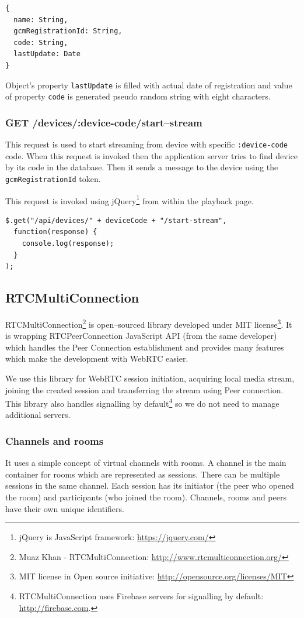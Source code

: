 \begin{lstlisting}
{
  name: String,
  gcmRegistrationId: String,
  code: String,
  lastUpdate: Date
}
\end{lstlisting}

Object's property \verb!lastUpdate! is filled with actual date of registration and value of property \verb!code! is generated pseudo random string with eight characters.


\subsubsection{GET /devices/:device-code/start--stream}
\label{sssec:rest-stream}
This request is used to start streaming from device with specific \verb!:device-code! code. When this request is invoked then the application server tries to find device by its code in the database. Then it sends a message to the device using the \verb!gcmRegistrationId! token.

This request is invoked using jQuery\footnote{jQuery is JavaScript framework: \url{https://jquery.com/}} from within the playback page.
\begin{lstlisting}
$.get("/api/devices/" + deviceCode + "/start-stream",
  function(response) {
    console.log(response);
  }
);
\end{lstlisting}



\subsection{RTCMultiConnection}
RTCMultiConnection\footnote{Muaz Khan - RTCMultiConnection: \url{http://www.rtcmulticonnection.org/}} is open--sourced library developed under MIT license\footnote{MIT license in Open source initiative: \url{http://opensource.org/licenses/MIT}}. It is wrapping RTCPeerConnection JavaScript API (from the same developer) which handles the Peer Connection establishment and provides many features which make the development with WebRTC easier.

We use this library for WebRTC session initiation, acquiring local media stream, joining the created session and transferring the stream using Peer connection. This library also handles signalling by default\footnote{RTCMultiConnection uses Firebase servers for signalling by default: \url{http://firebase.com}.} so we do not need to manage additional servers. 

\subsubsection{Channels and rooms}
It uses a simple concept of virtual channels with rooms. A channel is the main container for rooms which are represented as sessions. There can be multiple sessions in the same channel. Each session has its initiator (the peer who opened the room) and participants (who joined the room). Channels, rooms and peers have their own unique identifiers.


